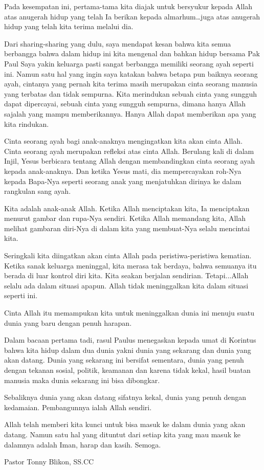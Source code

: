 \documentclass[12pt, twoside, a4paper,startany]{scrbook}
\begin{document}
Pada kesempatan ini, pertama-tama kita diajak untuk bersyukur kepada Allah atas anugerah hidup yang telah Ia berikan kepada almarhum…juga atas anugerah hidup yang telah kita terima melalui dia. 

Dari sharing-sharing yang dulu, saya mendapat kesan bahwa kita semua berbangga bahwa dalam hidup ini kita mengenal dan bahkan hidup bersama Pak Paul Saya yakin keluarga pasti sangat berbangga memiliki seorang ayah seperti ini. Namun satu hal yang ingin saya katakan bahwa betapa pun baiknya seorang ayah, cintanya yang pernah kita terima masih merupakan cinta seorang manusia yang terbatas dan tidak sempurna. Kita merindukan sebuah cinta yang sungguh dapat dipercayai, sebuah cinta yang sungguh sempurna, dimana hanya Allah sajalah yang mampu memberikannya. Hanya Allah dapat memberikan apa yang kita rindukan.

Cinta seorang ayah bagi anak-anaknya mengingatkan kita akan cinta Allah. Cinta seorang ayah merupakan refleksi atas cinta Allah. Berulang kali di dalam Injil, Yesus berbicara tentang Allah dengan membandingkan cinta seorang ayah kepada anak-anaknya. Dan ketika Yesus mati, dia mempercayakan roh-Nya kepada Bapa-Nya seperti seorang anak yang menjatuhkan dirinya ke dalam rangkulan sang ayah. 

Kita adalah anak-anak Allah. Ketika Allah menciptakan kita, Ia menciptakan menurut gambar dan rupa-Nya sendiri. Ketika Allah memandang kita, Allah melihat gambaran diri-Nya di dalam kita yang membuat-Nya selalu mencintai kita. 

Seringkali kita diingatkan akan cinta Allah pada peristiwa-peristiwa kematian. Ketika sanak keluarga meninggal, kita merasa tak berdaya, bahwa semuanya itu berada di luar kontrol diri kita. Kita seakan berjalan sendirian. Tetapi...Allah selalu ada dalam situasi apapun. Allah tidak meninggalkan kita dalam situasi seperti ini. 

Cinta Allah itu memampukan kita untuk meninggalkan dunia ini menuju suatu dunia yang baru dengan penuh harapan. 

Dalam bacaan pertama tadi, rasul Paulus menegaskan kepada umat di Korintus bahwa kita hidup dalam dua dunia yakni dunia yang sekarang dan dunia yang akan datang. Dunia yang sekarang ini bersifat sementara, dunia yang penuh dengan tekanan sosial, politik, keamanan dan karena tidak kekal, hasil buatan manusia maka dunia sekarang ini bisa dibongkar. 

Sebaliknya dunia yang akan datang sifatnya kekal, dunia yang penuh dengan kedamaian. Pembangunnya ialah Allah sendiri. 

Allah telah memberi kita kunci untuk bisa masuk ke dalam dunia yang akan datang. Namun satu hal yang dituntut dari setiap kita yang mau masuk ke dalamnya adalah Iman, harap dan kasih. Semoga. 

Pastor Tonny Blikon, SS.CC
\end{document}
